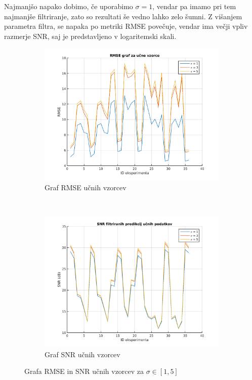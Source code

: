 Najmanjšo napako dobimo, če uporabimo $\sigma=1$, vendar pa imamo pri tem najmanjše filtriranje, zato so rezultati še vedno lahko zelo šumni. Z višanjem parametra filtra, se napaka po metriki RMSE povečuje, vendar ima večji vpliv razmerje SNR, saj je predstavljeno v logaritemski skali. 

\begin{figure}[!htb]
\centering
\begin{subfigure}[t]{0.45\columnwidth}
\includegraphics[width=\columnwidth]{./Slike/sigma-rmse1-5.png}
\caption{Graf RMSE  učnih vzorcev }
\label{fig:sigma-rmse1-5}
\end{subfigure}
~
\begin{subfigure}[t]{0.45\columnwidth}
\includegraphics[width=\columnwidth]{./Slike/sigma-snr1-5.png}
\caption{Graf SNR  učnih vzorcev}
\label{fig:sigma-snr1-5}
\end{subfigure}
\caption{Grafa RMSE in SNR učnih vzorcev za \mbox{$\sigma \in [1,5]$}}
\label{fig:sigma1-5}
\end{figure}

